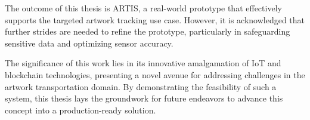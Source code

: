 The outcome of this thesis is ARTIS, a real-world prototype that effectively supports the targeted artwork tracking use case. However, it is acknowledged that further strides are needed to refine the prototype, particularly in safeguarding sensitive data and optimizing sensor accuracy.

The significance of this work lies in its innovative amalgamation of IoT and blockchain technologies, presenting a novel avenue for addressing challenges in the artwork transportation domain. By demonstrating the feasibility of such a system, this thesis lays the groundwork for future endeavors to advance this concept into a production-ready solution.
